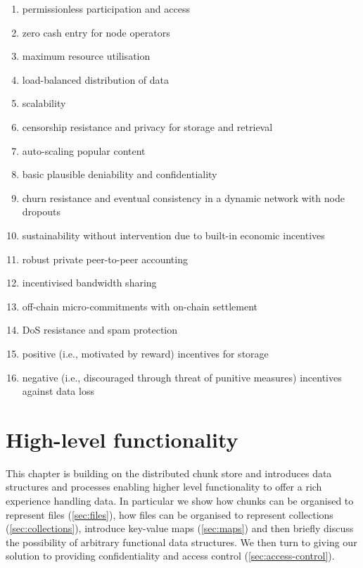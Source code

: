 \begin{enumerate}
    \item permissionless participation and access
    \item zero cash entry for node operators
    \item maximum resource utilisation 
    \item load-balanced distribution of data
    \item scalability 
    \item censorship resistance and privacy for storage and retrieval
    \item auto-scaling popular content
    \item basic plausible deniability and confidentiality 
    \item churn resistance and eventual consistency in a dynamic network with node dropouts
    \item sustainability without intervention due to built-in economic incentives
    \item robust private peer-to-peer accounting 
    \item incentivised bandwidth sharing
    \item off-chain micro-commitments with on-chain settlement
    \item DoS resistance and spam protection
    \item positive (i.e., motivated by reward) incentives for storage
    \item negative (i.e., discouraged through threat of punitive measures) incentives against data loss
\end{enumerate}


\chapter{High-level functionality}\label{sec:high-level-functionality}


This chapter is building on the distributed chunk store and introduces data structures and processes enabling higher level functionality to offer a rich experience handling data. In particular we show how chunks can be organised to represent files (\ref{sec:files}), how files can be organised to represent collections (\ref{sec:collections}), introduce key-value maps (\ref{sec:maps}) and then briefly discuss the possibility of arbitrary functional data structures. We then turn to giving our solution to providing confidentiality and access control (\ref{sec:access-control}). 

